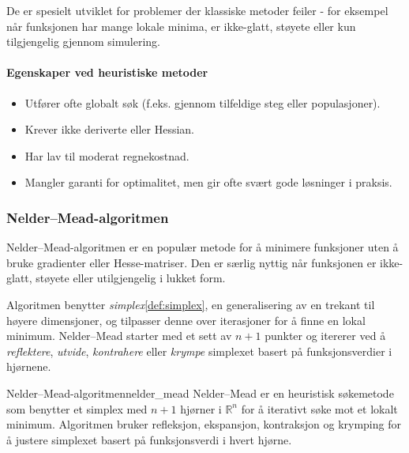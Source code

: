 De er spesielt utviklet for problemer der klassiske metoder feiler - for eksempel når funksjonen har mange lokale minima, er ikke-glatt, støyete eller kun tilgjengelig gjennom simulering.

\paragraph{Egenskaper ved heuristiske metoder}

\begin{itemize}
	\item Utfører ofte globalt søk (f.eks. gjennom tilfeldige steg eller populasjoner).
	\item Krever ikke deriverte eller Hessian.
	\item Har lav til moderat regnekostnad.
	\item Mangler garanti for optimalitet, men gir ofte svært gode løsninger i praksis.
\end{itemize}

\subsubsection{Nelder--Mead-algoritmen}
\label{sec:nelder_mead}

Nelder--Mead-algoritmen er en populær metode for å minimere funksjoner uten å bruke gradienter eller Hesse-matriser.
Den er særlig nyttig når funksjonen er ikke-glatt, støyete eller utilgjengelig i lukket form.

Algoritmen benytter \emph{simplex}\ref{def:simplex}, en generalisering av en trekant til høyere dimensjoner, og tilpasser denne over iterasjoner for å finne en lokal minimum.
Nelder--Mead starter med et sett av \( n+1 \) punkter og itererer ved å \emph{reflektere}, \emph{utvide}, \emph{kontrahere} eller \emph{krympe} simplexet basert på funksjonsverdier i hjørnene.

\begin{definition}{Nelder--Mead-algoritmen}{nelder_mead}
	Nelder--Mead er en heuristisk søkemetode som benytter et simplex med \( n+1 \) hjørner i \( \mathbb{R}^n \) for å iterativt søke mot et lokalt minimum.
	Algoritmen bruker refleksjon, ekspansjon, kontraksjon og krymping for å justere simplexet basert på funksjonsverdi i hvert hjørne.
\end{definition}

